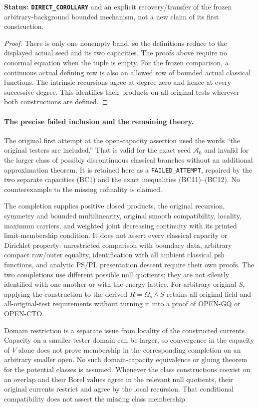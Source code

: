 \documentclass[11pt,a4paper]{article}
\numberwithin{equation}{section}
\theoremstyle{definition}
\theoremstyle{remark}
\begin{document}
\noindent\textbf{Status: \texttt{DIRECT\_COROLLARY}} and an
explicit recovery/transfer of the frozen arbitrary-background
bounded mechanism, not a new claim of its first construction.

\begin{proof}
There is only one nonempty band, so the definitions reduce to
the displayed actual seed and its two capacities. The proofs
above require no conormal equation when the tuple is empty.
For the frozen comparison, a continuous actual defining row
is also an allowed row of bounded actual classical functions.
The intrinsic recursions agree at degree zero and hence at
every successive degree. This identifies their products on
all original tests wherever both constructions are defined.
\end{proof}

\paragraph{The precise failed inclusion and the remaining theory.}
The original first attempt at the open-capacity assertion used
the words ``the original testers are included.'' That is valid
for the exact seed $\mathcal A_0$ and invalid for the larger
class of possibly discontinuous classical branches without an
additional approximation theorem. It is retained here as a
\texttt{FAILED\_ATTEMPT}, repaired by the two separate capacities
(BC1) and the exact inequalities (BC11)--(BC12). No counterexample
to the missing cofinality is claimed.

The completion supplies positive closed products, the original
recursion, symmetry and bounded multilinearity, original smooth
compatibility, locality, maximum carriers, and weighted joint
decreasing continuity with its printed limit-membership condition.
It does not assert every classical capacity or Dirichlet property:
unrestricted comparison with boundary data, arbitrary compact
raw/outer equality, identification with all ambient classical psh
functions, and analytic PS/PL presentation descent require their
own proofs. The two completions use different possible null
quotients; they are not silently identified with one another or
with the energy lattice. For arbitrary original $S$, applying
the construction to the derived $R=\Omega_s\wedge S$ retains
all original-field and all-original-test requirements without
turning it into a proof of OPEN-GQ or OPEN-CTO.

Domain restriction is a separate issue from locality of the
constructed currents. Capacity on a smaller tester domain can
be larger, so convergence in the capacity of $V$ alone does not
prove membership in the corresponding completion on an arbitrary
smaller open. No such domain-capacity equivalence or gluing theorem
for the potential classes is assumed. Whenever the class
constructions coexist on an overlap and their Borel values agree
in the relevant null quotients, their original currents restrict
and agree by the local recursion. That conditional compatibility
does not assert the missing class membership.
\end{document}
